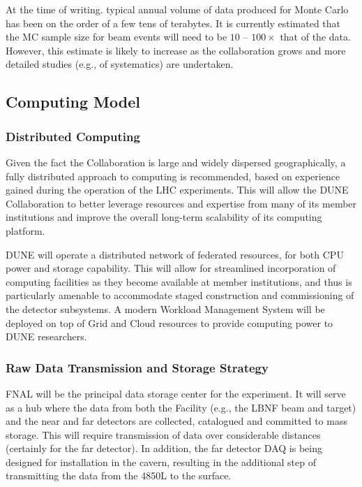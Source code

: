 At the time of writing. typical annual volume of data produced for Monte Carlo has been on the order of a few tens of terabytes.
It is currently estimated that the MC sample size for beam events will
need to be $10$ -- $100\times$ that of the data.
However, this estimate is likely to increase as the collaboration grows
and more detailed studies (e.g., of systematics) are undertaken. %

\subsection{Computing Model}
\label{sec:detectors-sc-infrastructure-computing-model}

\subsubsection{Distributed Computing}

Given the fact the Collaboration is large and widely dispersed geographically, a fully distributed approach to computing is recommended, based on experience
gained during the operation of the LHC experiments. This will allow the DUNE Collaboration to better leverage resources and expertise from many of its
member institutions and improve the overall long-term scalability of its computing platform.

DUNE will operate a  distributed network of federated resources, for both CPU power and storage capability. This will allow for streamlined incorporation
of computing facilities as they become available at member institutions, and thus is particularly amenable to accommodate staged construction and commissioning
of the detector subsystems. A modern Workload Management System will be deployed on top of Grid and Cloud resources to provide computing
power to DUNE researchers.  %

\subsubsection{Raw Data Transmission and Storage Strategy}
FNAL will be the principal data storage center for the experiment. It will serve as a hub where the data from both the Facility (e.g., the LBNF beam and target)
and the %
near and far detectors are collected, catalogued and committed to mass storage. This will %
require transmission of
data over considerable distances (certainly for the far detector). In addition, the far detector DAQ is %
being designed for installation %
in the cavern, resulting in the additional step of transmitting the data from the 4850L to the surface.

